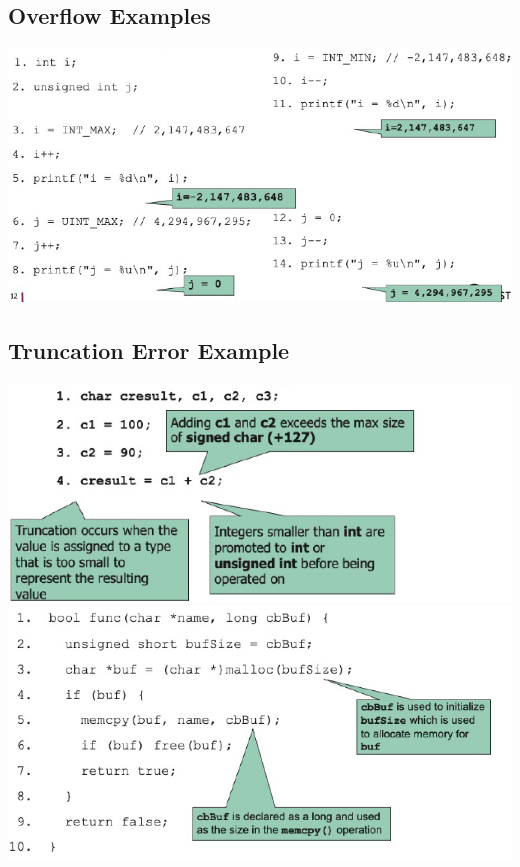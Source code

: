 \subsection{Overflow Examples}
\includegraphics[width=\linewidth]{../img/overflow_examples.png}

\subsection{Truncation Error Example}
\includegraphics[width=\linewidth]{../img/truncation_error.png}
\includegraphics[width=\linewidth]{../img/truncation_error2.png}

